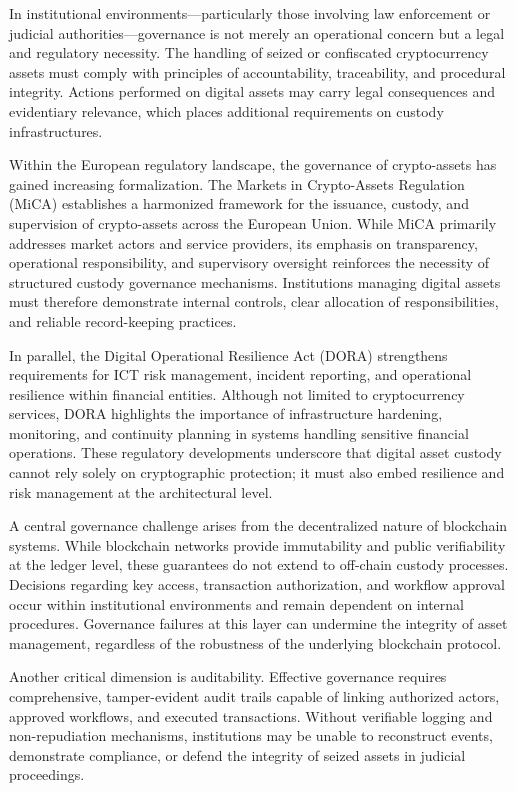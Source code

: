 \documentclass[12pt,a4paper]{report}
\begin{document}
In institutional environments—particularly those involving law enforcement or judicial authorities—governance is not merely an operational concern but a legal and regulatory necessity. The handling of seized or confiscated cryptocurrency assets must comply with principles of accountability, traceability, and procedural integrity. Actions performed on digital assets may carry legal consequences and evidentiary relevance, which places additional requirements on custody infrastructures.

Within the European regulatory landscape, the governance of crypto-assets has gained increasing formalization. The Markets in Crypto-Assets Regulation (MiCA) \cite{MiCA2023} establishes a harmonized framework for the issuance, custody, and supervision of crypto-assets across the European Union. While MiCA primarily addresses market actors and service providers, its emphasis on transparency, operational responsibility, and supervisory oversight reinforces the necessity of structured custody governance mechanisms. Institutions managing digital assets must therefore demonstrate internal controls, clear allocation of responsibilities, and reliable record-keeping practices.

In parallel, the Digital Operational Resilience Act (DORA) \cite{DORA2022} strengthens requirements for ICT risk management, incident reporting, and operational resilience within financial entities. Although not limited to cryptocurrency services, DORA highlights the importance of infrastructure hardening, monitoring, and continuity planning in systems handling sensitive financial operations. These regulatory developments underscore that digital asset custody cannot rely solely on cryptographic protection; it must also embed resilience and risk management at the architectural level.

A central governance challenge arises from the decentralized nature of blockchain systems. While blockchain networks provide immutability and public verifiability at the ledger level, these guarantees do not extend to off-chain custody processes. Decisions regarding key access, transaction authorization, and workflow approval occur within institutional environments and remain dependent on internal procedures. Governance failures at this layer can undermine the integrity of asset management, regardless of the robustness of the underlying blockchain protocol.

Another critical dimension is auditability. Effective governance requires comprehensive, tamper-evident audit trails capable of linking authorized actors, approved workflows, and executed transactions. Without verifiable logging and non-repudiation mechanisms, institutions may be unable to reconstruct events, demonstrate compliance, or defend the integrity of seized assets in judicial proceedings.
\end{document}
